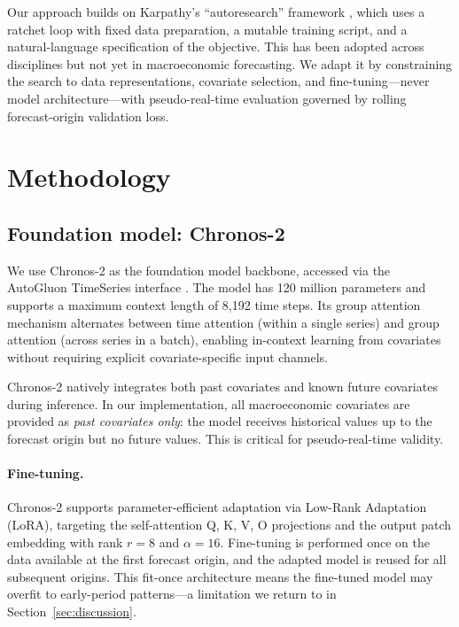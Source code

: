 \documentclass[12pt,a4paper]{article}
\begin{document}
Our approach builds on Karpathy's ``autoresearch'' framework \citep{karpathy2026autoresearch}, which uses a ratchet loop with fixed data preparation, a mutable training script, and a natural-language specification of the objective. This has been adopted across disciplines \citep{oconnell2026signal,weidener2026rethinking,liu2026autoresearchclaw} but not yet in macroeconomic forecasting. We adapt it by constraining the search to data representations, covariate selection, and fine-tuning---never model architecture---with pseudo-real-time evaluation governed by rolling forecast-origin validation loss.


\section{Methodology}
\label{sec:methodology}

\subsection{Foundation model: Chronos-2}
\label{sec:chronos}

We use Chronos-2 \citep{ansari2025chronos2} as the foundation model backbone, accessed via the AutoGluon TimeSeries interface \citep{shchur2023autogluon}. The model has 120 million parameters and supports a maximum context length of 8,192 time steps. Its group attention mechanism alternates between time attention (within a single series) and group attention (across series in a batch), enabling in-context learning from covariates without requiring explicit covariate-specific input channels.

Chronos-2 natively integrates both past covariates and known future covariates during inference. In our implementation, all macroeconomic covariates are provided as \emph{past covariates only}: the model receives historical values up to the forecast origin but no future values. This is critical for pseudo-real-time validity.

\paragraph{Fine-tuning.} Chronos-2 supports parameter-efficient adaptation via Low-Rank Adaptation (LoRA), targeting the self-attention Q, K, V, O projections and the output patch embedding with rank $r = 8$ and $\alpha = 16$. Fine-tuning is performed once on the data available at the first forecast origin, and the adapted model is reused for all subsequent origins. This fit-once architecture means the fine-tuned model may overfit to early-period patterns---a limitation we return to in Section~\ref{sec:discussion}.
\end{document}
